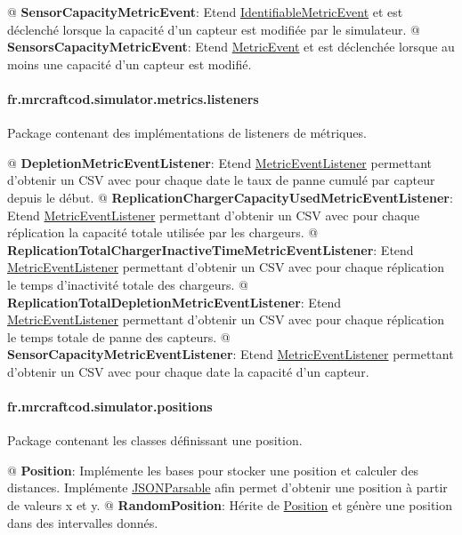 \documentclass[final]{polytech/polytech}
\newcommand{\class}[1]{\textbf{#1}\label{class:#1}}
\newcommand{\klass}[1]{\hyperref[class:#1]{#1}}
\begin{document}
				\begin{easylist}
					@ \class{SensorCapacityMetricEvent}: Etend \klass{IdentifiableMetricEvent} et est déclenché lorsque la capacité d'un capteur est modifiée par le simulateur.
					@ \class{SensorsCapacityMetricEvent}: Etend \klass{MetricEvent} et est déclenchée lorsque au moins une capacité d'un capteur est modifié.
				\end{easylist}
				
			\paragraph{fr.mrcraftcod.simulator.metrics.listeners}
				Package contenant des implémentations de listeners de métriques.
				
				\begin{easylist}
					@ \class{DepletionMetricEventListener}: Etend \klass{MetricEventListener} permettant d'obtenir un CSV avec pour chaque date le taux de panne cumulé par capteur depuis le début.
					@ \class{ReplicationChargerCapacityUsedMetricEventListener}: Etend \klass{MetricEventListener} permettant d'obtenir un CSV avec pour chaque réplication la capacité totale utilisée par les chargeurs.
					@ \class{ReplicationTotalChargerInactiveTimeMetricEventListener}: Etend \klass{MetricEventListener} permettant d'obtenir un CSV avec pour chaque réplication le temps d'inactivité totale des chargeurs.
					@ \class{ReplicationTotalDepletionMetricEventListener}: Etend \klass{MetricEventListener} permettant d'obtenir un CSV avec pour chaque réplication le temps totale de panne des capteurs.
					@ \class{SensorCapacityMetricEventListener}: Etend \klass{MetricEventListener} permettant d'obtenir un CSV avec pour chaque date la capacité d'un capteur.
				\end{easylist}
				
			\paragraph{fr.mrcraftcod.simulator.positions}
				Package contenant les classes définissant une position.
				
				\begin{easylist}
					@ \class{Position}: Implémente les bases pour stocker une position et calculer des distances. Implémente \klass{JSONParsable} afin permet d'obtenir une position à partir de valeurs x et y.
					@ \class{RandomPosition}: Hérite de \klass{Position} et génère une position dans des intervalles donnés.
				\end{easylist}
				
\end{document}
